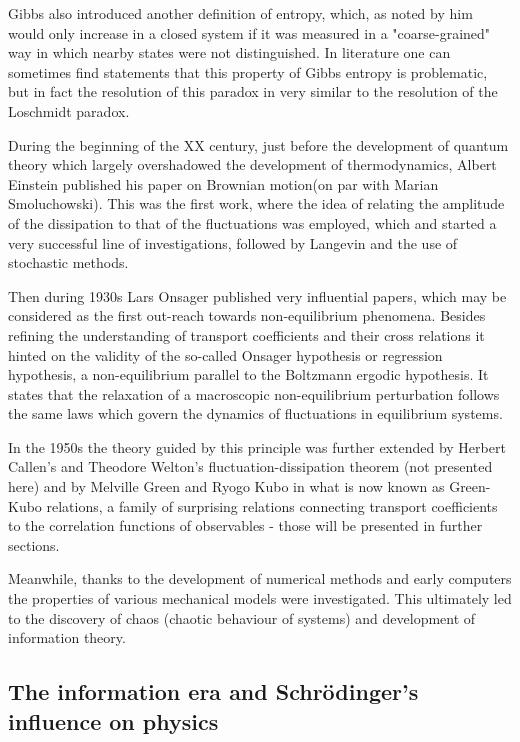 \documentclass[a4paper,12pt]{article}
\begin{document}
Gibbs also introduced another definition of entropy, which, as noted by him \cite{Gibbs:1928tw} would only increase in a closed system if it was measured in a "coarse-grained" way in which nearby states were not distinguished. In literature one can sometimes find statements \cite{Evans:2241458} that this property of Gibbs entropy is problematic, but in fact the resolution of this paradox in very similar to the resolution of the Loschmidt paradox.

During the beginning of the XX century, just before 
the development of quantum theory which largely overshadowed the development of thermodynamics, Albert Einstein published his paper on Brownian motion\cite{Einstein:eEYNf903}(on par with Marian Smoluchowski). This was the first work, where the idea of relating the amplitude of the dissipation to that of the fluctuations was employed, which and started a very successful line of investigations, followed by Langevin and the use of stochastic methods.

Then during 1930s Lars Onsager published very influential papers\cite{Onsager:zgWBDrcO, Onsager:sJs1Kffm}, which may be considered as the first out-reach towards non-equilibrium phenomena.
Besides refining the understanding of transport coefficients and their cross relations it hinted on the validity of the so-called Onsager hypothesis or regression hypothesis, a non-equilibrium parallel to the Boltzmann ergodic hypothesis. It states that the relaxation of a macroscopic non-equilibrium perturbation follows the same laws which govern the dynamics of fluctuations in equilibrium systems.

In the 1950s the theory guided by this principle was further extended by  Herbert Callen's and Theodore Welton's fluctuation-dissipation theorem (not presented here) and by Melville Green and Ryogo Kubo in what is now known as Green-Kubo relations\cite{Kubo:1957cl}, a family of surprising relations connecting transport coefficients to the correlation functions of observables - those will be presented in further sections. 

Meanwhile, thanks to the development of numerical methods and early computers the properties of various mechanical models were investigated.
This ultimately led to the discovery of chaos (chaotic behaviour of systems) and development of information theory.

\subsection{The information era and Schrödinger's influence on physics}
\end{document}
